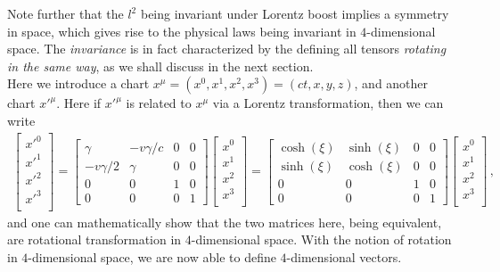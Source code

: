 \documentclass[11pt, onesided]{book}
\theoremstyle{break}
\theoremstyle{break}
\newcommand{\bmat}[1]{\begin{bmatrix} #1 \end{bmatrix}}
\begin{document}
Note further that the $l^2$ being invariant under Lorentz boost implies a symmetry in space, which gives rise to the physical laws being invariant in $4$-dimensional space. The \textit{invariance} is in fact characterized by the defining all tensors \textit{rotating in the same way}, as we shall discuss in the next section.\\

Here we introduce a chart $x^\mu = (x^0, x^1,x^2,x^3) = (ct,x,y,z)$, and another chart $x'^\mu$. Here if $x'^\mu$ is related to $x^\mu$ via a Lorentz transformation, then we can write
\begin{align*}
\bmat{
x'^0\\
x'^1\\
x'^2\\
x'^3\\
} = 
\bmat{
\gamma & -v\gamma/c & 0 & 0 \\
-v\gamma/2 & \gamma & 0 & 0 \\
0 & 0 & 1 & 0\\
0 & 0 & 0 & 1
}
\bmat{
x^0\\
x^1\\
x^2\\
x^3\\
}
= 
\bmat{
\cosh(\xi) & \sinh(\xi) & 0 & 0 \\
\sinh(\xi) & \cosh(\xi) & 0 & 0 \\
0 & 0 & 1 & 0\\
0 & 0 & 0 & 1
}
\bmat{
x^0\\
x^1\\
x^2\\
x^3\\
}\,,
\end{align*}
and one can mathematically show that the two matrices here, being equivalent, are rotational transformation in $4$-dimensional space. With the notion of rotation in $4$-dimensional space, we are now able to define $4$-dimensional vectors. \\
\end{document}
